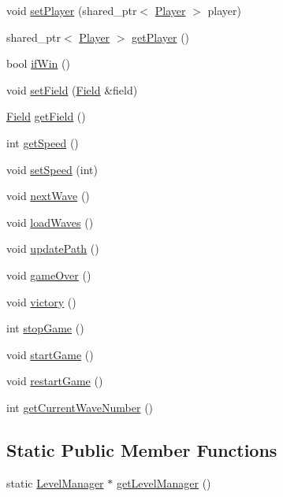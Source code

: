\begin{DoxyCompactItemize}
void \hyperlink{class_level_manager_ae82f34baef0c9bd5e4b9db6156b45f85}{set\+Player} (shared\+\_\+ptr$<$ \hyperlink{class_player}{Player} $>$ player)
\item 
shared\+\_\+ptr$<$ \hyperlink{class_player}{Player} $>$ \hyperlink{class_level_manager_acb860de9f9ccb23b4a799d857bec1cf9}{get\+Player} ()
\item 
bool \hyperlink{class_level_manager_abb8626a3a8aac40f066c203faac35b20}{if\+Win} ()
\item 
void \hyperlink{class_level_manager_a4435cdb4ae2d199c372d4047f0dc0c92}{set\+Field} (\hyperlink{class_field}{Field} \&field)
\item 
\hyperlink{class_field}{Field} \hyperlink{class_level_manager_aa0968f6bf0d80f7b50658aca7f487508}{get\+Field} ()
\item 
int \hyperlink{class_level_manager_a8794dccc6438fc2058a78d625f508841}{get\+Speed} ()
\item 
void \hyperlink{class_level_manager_ab7945c7629de9d3e77bf6328779aed35}{set\+Speed} (int)
\item 
void \hyperlink{class_level_manager_aa883e507745c8d405ef2cdd2b6351dfa}{next\+Wave} ()
\item 
void \hyperlink{class_level_manager_a4cb7dacced44be50765c930e5e73f217}{load\+Waves} ()
\item 
void \hyperlink{class_level_manager_a53c800a80f6f78702d6eaf3b43ca2d2b}{update\+Path} ()
\item 
void \hyperlink{class_level_manager_a488b4c395d164dc5b1975b69f45eb9ac}{game\+Over} ()
\item 
void \hyperlink{class_level_manager_a3fda56827462d66760c612c2a382fc05}{victory} ()
\item 
int \hyperlink{class_level_manager_a7d1ad576cc249a90c17fd06fa907976a}{stop\+Game} ()
\item 
void \hyperlink{class_level_manager_a128f679f42d155e38a657feac3c2cc78}{start\+Game} ()
\item 
void \hyperlink{class_level_manager_a23dcc64c396c58ac864c7d032b3618cf}{restart\+Game} ()
\item 
int \hyperlink{class_level_manager_a7e3e06f49d24c49be1a58124a2aa92eb}{get\+Current\+Wave\+Number} ()
\end{DoxyCompactItemize}
\subsection*{Static Public Member Functions}
\begin{DoxyCompactItemize}
\item 
static \hyperlink{class_level_manager}{Level\+Manager} $\ast$ \hyperlink{class_level_manager_a0c42183e70000a197ac63a631fc14c97}{get\+Level\+Manager} ()
\end{DoxyCompactItemize}


